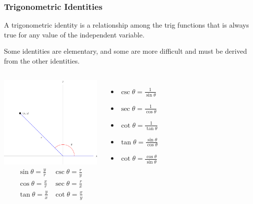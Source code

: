 \begin{frame}
\frametitle{Trigonometric Identities}
\begin{definition}
A trigonometric identity is a relationship among the trig functions that is always true for any value of the independent variable.

Some identities are elementary, and some are more difficult and must be derived from the other identities.
\end{definition}
\end{frame}


\begin{frame}
\begin{columns}[c]
\includegraphics[width=5cm]{trigonometry/pictures/app-d-ratiosb.pdf}%
\[
\begin{array}{cc}
\sin \theta = \frac{ y}{ r} &
\csc \theta = \frac{ r}{ y} \\
\cos \theta = \frac{ x}{ r} &
\sec \theta = \frac{ r}{ x} \\
\tan \theta = \frac{ y}{ x} &
\cot \theta = \frac{ x}{ y} \\
\end{array}
\]
\begin{itemize}
\item $\csc \theta = \frac{1}{\sin \theta}$
\item $\sec \theta = \frac{1}{\cos \theta}$
\item $\cot \theta = \frac{1}{\tan \theta}$
\item $\tan \theta = \frac{\sin \theta}{\cos \theta}$
\item $\cot \theta = \frac{\cos \theta}{\sin \theta}$
\end{itemize}
\end{columns}
\end{frame}


